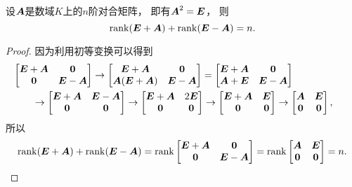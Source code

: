 \begin{example}\label{example:对合矩阵.对合矩阵的秩的性质1}
设\(\boldsymbol{A}\)是数域\(K\)上的\(n\)阶对合矩阵，
即有\(\boldsymbol{A}^2=\boldsymbol{E}\)，
则\begin{equation*}
	\rank(\boldsymbol{E}+\boldsymbol{A})+\rank(\boldsymbol{E}-\boldsymbol{A})=n.
\end{equation*}
\begin{proof}
因为利用初等变换可以得到\begin{align*}
	&\hspace{-20pt}
	\begin{bmatrix}
		\vb{E}+\vb{A} & \vb0 \\
		\vb0 & \vb{E}-\vb{A}
	\end{bmatrix}
	\to \begin{bmatrix}
		\vb{E}+\vb{A} & \vb0 \\
		\vb{A}(\vb{E}+\vb{A}) & \vb{E}-\vb{A}
	\end{bmatrix}
	= \begin{bmatrix}
		\vb{E}+\vb{A} & \vb0 \\
		\vb{A}+\vb{E} & \vb{E}-\vb{A}
	\end{bmatrix} \\
	&\to \begin{bmatrix}
		\vb{E}+\vb{A} & \vb{E}-\vb{A} \\
		\vb0 & \vb0
	\end{bmatrix}
	\to \begin{bmatrix}
		\vb{E}+\vb{A} & 2\vb{E} \\
		\vb0 & \vb0
	\end{bmatrix}
	\to \begin{bmatrix}
		\vb{E}+\vb{A} & \vb{E} \\
		\vb0 & \vb0
	\end{bmatrix}
	\to \begin{bmatrix}
		\vb{A} & \vb{E} \\
		\vb0 & \vb0
	\end{bmatrix},
\end{align*}
所以\begin{equation*}
	\rank(\boldsymbol{E}+\boldsymbol{A})+\rank(\boldsymbol{E}-\boldsymbol{A})
	=\rank\begin{bmatrix}
		\boldsymbol{E}+\boldsymbol{A} & \boldsymbol0 \\
		\boldsymbol0 & \boldsymbol{E}-\boldsymbol{A}
	\end{bmatrix}
	= \rank\begin{bmatrix}
		\boldsymbol{A} & \boldsymbol{E} \\
		\boldsymbol0 & \boldsymbol0
	\end{bmatrix}
	= n.
	\qedhere
\end{equation*}
\end{proof}
\end{example}

